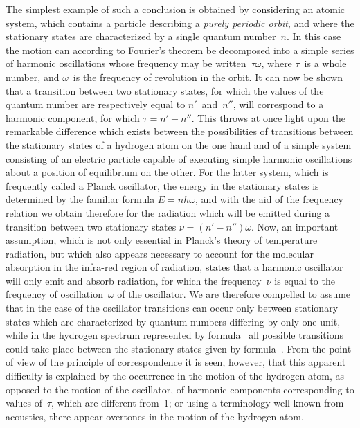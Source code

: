 The simplest example of such a conclusion is obtained by
considering an atomic system, which contains a particle describing
a \emph{purely periodic orbit}, and where the stationary states are characterized
by a single quantum number~$n$. In this case the motion
can according to Fourier's theorem be decomposed into a simple
series of harmonic oscillations whose frequency may be written~$\tau\omega$,
where $\tau$~is a whole number, and $\omega$~is the frequency of revolution
in the orbit. It can now be shown that a transition between two
stationary states, for which the values of the quantum number are
respectively equal to $n'$~and~$n''$, will correspond to a harmonic
component, for which $\tau = n' - n''$. This throws at once light upon
the remarkable difference which exists between the possibilities
of transitions between the stationary states of a hydrogen atom
on the one hand and of a simple system consisting of an electric
particle capable of executing simple harmonic oscillations about a
position of equilibrium on the other. For the latter system, which
is frequently called a Planck oscillator, the energy in the stationary
states is determined by the familiar formula $E = nh\omega$, and with the
aid of the frequency relation we obtain therefore for the radiation
which will be emitted during a transition between two stationary
states $\nu = (n' - n'') \omega$. Now, an important assumption, which is not
only essential in Planck's theory of temperature radiation, but
which also appears necessary to account for the molecular absorption
in the infra-red region of radiation, states that a harmonic oscillator
will only emit and absorb radiation, for which the frequency~$\nu$ is
equal to the frequency of oscillation~$\omega$ of the oscillator. We are
therefore compelled to assume that in the case of the oscillator
transitions can occur only between stationary states which are
characterized by quantum numbers differing by only one unit,
while in the hydrogen spectrum represented by formula~ all
possible transitions could take place between the stationary states
given by formula~. From the point of view of the principle of
correspondence it is seen, however, that this apparent difficulty is
explained by the occurrence in the motion of the hydrogen atom,
as opposed to the motion of the oscillator, of harmonic components
corresponding to values of~$\tau$, which are different from~$1$; or using
a terminology well known from acoustics, there appear overtones
in the motion of the hydrogen atom.

